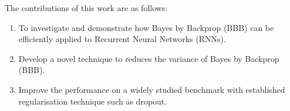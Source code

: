 The contributions of this work are as follows:
\begin{enumerate}
	\item To investigate and demonstrate how Bayes by Backprop (BBB) can be efficiently applied to Recurrent Neural Networks (RNNs).
	\item Develop a novel technique to reduces the variance of Bayes by Backprop (BBB).
	\item Improve the performance on a widely studied benchmark with established regularisation technique such as dropout.
\end{enumerate}